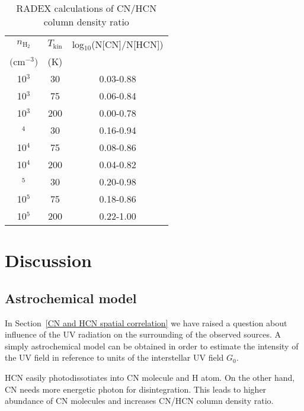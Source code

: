 \documentclass{aa}
\begin{document}
\begin{table}
\caption{RADEX calculations of CN/HCN column density ratio}             %
\label{table:5}      %
\centering                          %
\begin{tabular}{c c c} 
\hline\hline  
$n_\mathrm{H_2}$ & $T_\mathrm{kin}$ & log$_{10}$(N[CN]/N[HCN]) \\
$($cm$^{-3})$ & (K) & \\
\hline
10$^{3}$ & 30 & 0.03-0.88\\
10$^{3}$ & 75 & 0.06-0.84\\
10$^{3}$ & 200 & 0.00-0.78\\ \hdashline
10$^{4}$ & 30 & 0.16-0.94\\
10$^{4}$ & 75 & 0.08-0.86\\
10$^{4}$ & 200 & 0.04-0.82\\ \hdashline
10$^{5}$ & 30 & 0.20-0.98\\
10$^{5}$ & 75 & 0.18-0.86\\
10$^{5}$ & 200 & 0.22-1.00\\ \hline
\end{tabular}
\end{table} 


\section{Discussion}
\subsection{Astrochemical model}
In Section~\ref{CN and HCN spatial correlation} we have raised a question about influence of the UV radiation on the surrounding of the observed sources. A simply astrochemical model can be obtained in order to estimate the intensity of the UV field in reference to units of the interstellar UV field $G_0$.



HCN easily photodissotiates into CN molecule and H atom. On the other hand, CN needs more energetic photon for disintegration. This leads to higher abundance of CN molecules and increases CN/HCN column density ratio.
\end{document}
